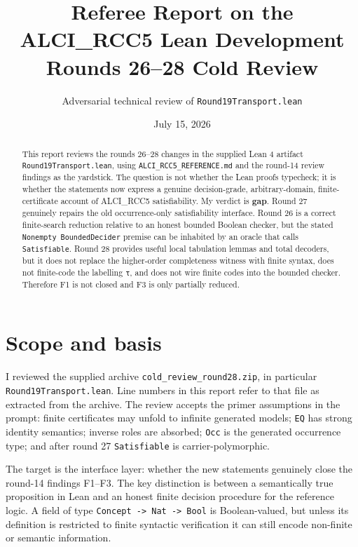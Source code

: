 \documentclass[11pt]{article}
\title{Referee Report on the ALCI\_RCC5 Lean Development\\Rounds 26--28 Cold Review}
\author{Adversarial technical review of \texttt{Round19Transport.lean}}
\date{July 15, 2026}
\begin{document}
\maketitle

\begin{abstract}
This report reviews the rounds 26--28 changes in the supplied Lean 4 artifact \texttt{Round19Transport.lean}, using \texttt{ALCI\_RCC5\_REFERENCE.md} and the round-14 review findings as the yardstick. The question is not whether the Lean proofs typecheck; it is whether the statements now express a genuine decision-grade, arbitrary-domain, finite-certificate account of ALCI\_RCC5 satisfiability. My verdict is \textbf{gap}. Round 27 genuinely repairs the old occurrence-only satisfiability interface. Round 26 is a correct finite-search reduction relative to an honest bounded Boolean checker, but the stated \texttt{Nonempty BoundedDecider} premise can be inhabited by an oracle that calls \texttt{Satisfiable}. Round 28 provides useful local tabulation lemmas and total decoders, but it does not replace the higher-order completeness witness with finite syntax, does not finite-code the labelling \texttt{τ}, and does not wire finite codes into the bounded checker. Therefore F1 is not closed and F3 is only partially reduced.
\end{abstract}

\section{Scope and basis}

I reviewed the supplied archive \texttt{cold\_review\_round28.zip}, in particular \texttt{Round19Transport.lean}. Line numbers in this report refer to that file as extracted from the archive. The review accepts the primer assumptions in the prompt: finite certificates may unfold to infinite generated models; \texttt{EQ} has strong identity semantics; inverse roles are absorbed; \texttt{Occ} is the generated occurrence type; and after round 27 \texttt{Satisfiable} is carrier-polymorphic.

The target is the interface layer: whether the new statements genuinely close the round-14 findings F1--F3. The key distinction is between a semantically true proposition in Lean and an honest finite decision procedure for the reference logic. A field of type \texttt{Concept -> Nat -> Bool} is Boolean-valued, but unless its definition is restricted to finite syntactic verification it can still encode non-finite or semantic information.
\end{document}
